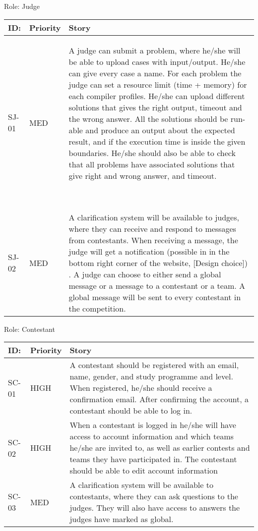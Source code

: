 \bigskip


\bigskip

Role: Judge

\begin{flushleft}
\tablehead{}
\begin{supertabular}{|p{0.1\textwidth}|p{0.1\textwidth}|p{0.8\textwidth}|}
\hline
ID: &
Priority &
Story\\\hline
SJ{}-01 &
MED &
A judge can submit a problem, where he/she will be able to upload cases
with input/output. He/she can give every case a name. For each problem
the judge can set a resource limit (time + memory) for each compiler
profiles. He/she can upload different solutions that gives the right
output, timeout and the wrong answer. All the solutions should be
run{}-able and produce an output about the expected result, and if the
execution time is inside the given boundaries. He/she should also be
able to check that all problems have associated solutions that give
right and wrong answer, and timeout.

~
\\\hline
SJ{}-02 &
MED &
A clarification system will be available to judges, where they can
receive and respond to messages from contestants. When receiving a
message, the judge will get a notification (possible in in the bottom
right corner of the website, [Design choice]) . A judge can choose to
either send a global message or a message to a contestant or a team. A
global message will be sent to every contestant in the
competition.\\\hline
\end{supertabular}
\end{flushleft}

\bigskip


\bigskip

Role: Contestant

\begin{flushleft}
\tablehead{}
\begin{supertabular}{|p{0.1\textwidth}|p{0.1\textwidth}|p{0.8\textwidth}|}
\hline
ID: &
Priority &
Story\\\hline
SC{}-01 &
HIGH &
A contestant should be registered with an email, name, gender, and study
programme and level. When registered, he/she should receive a
confirmation email. After confirming the account, a contestant should
be able to log in.\\\hline
SC{}-02 &
HIGH &
When a contestant is logged in he/she will have access to account
information and which teams he/she are invited to, as well as earlier
contests and teams they have participated in. The contestant should be
able to edit account information\\\hline
SC{}-03 &
MED &
A clarification system will be available to contestants, where they can
ask questions to the judges. They will also have access to answers the
judges have marked as global.\\\hline
\end{supertabular}
\end{flushleft}

